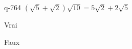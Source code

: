 \begin{truefalse}{q-764}
$(\sqrt{5}+\sqrt{2})\sqrt{10}=5\sqrt{2}+2\sqrt{5}$
\item* Vrai
\item Faux
\end{truefalse}

